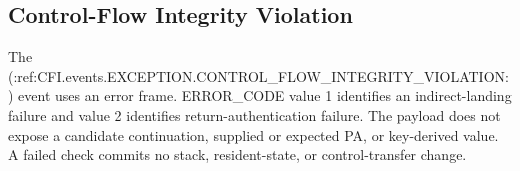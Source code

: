 \subsection{Control-Flow Integrity Violation}\label{section:cfi-violation}
The (:ref:CFI.events.EXCEPTION.CONTROL_FLOW_INTEGRITY_VIOLATION:) event uses an error frame. ERROR\_CODE value 1 identifies an indirect-landing failure and value 2 identifies return-authentication failure. The payload does not expose a candidate continuation, supplied or expected PA, or key-derived value. A failed check commits no stack, resident-state, or control-transfer change.
